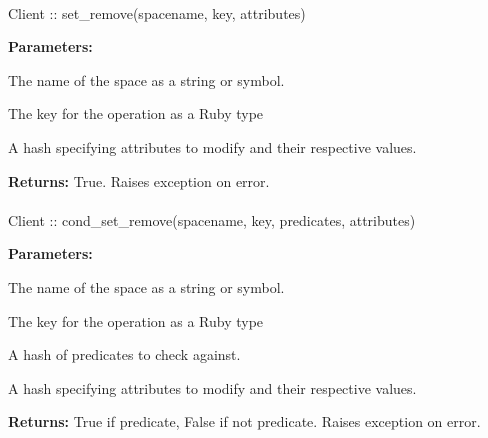 \paragraph{}
\label{api:ruby:set_remove}
\begin{ccode}
Client :: set_remove(spacename, key, attributes)
\end{ccode}
\funcdesc 

\noindent\textbf{Parameters:}
\begin{description}[labelindent=\widthof{{\code{attributes}}},leftmargin=*,noitemsep,nolistsep,align=right]
\item[\code{spacename}] The name of the space as a string or symbol.
\item[\code{key}] The key for the operation as a Ruby type
\item[\code{attributes}] A hash specifying attributes to modify and their respective values.
\end{description}

\noindent\textbf{Returns:}
True.  Raises exception on error.

\paragraph{}
\label{api:ruby:cond_set_remove}
\begin{ccode}
Client :: cond_set_remove(spacename, key, predicates, attributes)
\end{ccode}
\funcdesc 

\noindent\textbf{Parameters:}
\begin{description}[labelindent=\widthof{{\code{predicates}}},leftmargin=*,noitemsep,nolistsep,align=right]
\item[\code{spacename}] The name of the space as a string or symbol.
\item[\code{key}] The key for the operation as a Ruby type
\item[\code{predicates}] A hash of predicates to check against.
\item[\code{attributes}] A hash specifying attributes to modify and their respective values.
\end{description}

\noindent\textbf{Returns:}
True if predicate, False if not predicate.  Raises exception on error.

